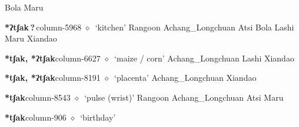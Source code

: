 \hspace{1ex}
         Bola 
\hspace{1ex}
         Maru 
  \item {\footnotesize \textbf{*ʔtʃak\,?\,}}{\tiny column-5968}
         $\diamond$~`kitchen'
         Rangoon 
\hspace{1ex}
         Achang\_Longchuan 
\hspace{1ex}
         Atsi 
\hspace{1ex}
         Bola 
\hspace{1ex}
         Lashi 
\hspace{1ex}
         Maru 
\hspace{1ex}
         Xiandao 
  \item {\footnotesize \textbf{*tʃak, *ʔtʃak}}{\tiny column-6627}
         $\diamond$~`maize / corn'
         Achang\_Longchuan 
\hspace{1ex}
         Lashi 
\hspace{1ex}
         Xiandao 
  \item {\footnotesize \textbf{*tʃak, *ʔtʃak}}{\tiny column-8191}
         $\diamond$~`placenta'
         Achang\_Longchuan 
\hspace{1ex}
         Xiandao 
  \item {\footnotesize \textbf{*tʃak}}{\tiny column-8543}
         $\diamond$~`pulse (wrist)'
         Rangoon 
\hspace{1ex}
         Achang\_Longchuan 
\hspace{1ex}
         Atsi 
\hspace{1ex}
         Maru 
  \item {\footnotesize \textbf{*tʃak}}{\tiny column-906}
         $\diamond$~`birthday'
